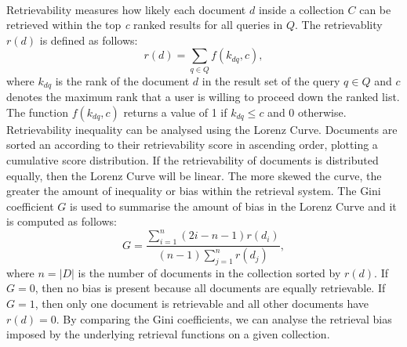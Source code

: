 \ \\
Retrievability measures how likely each document $ d $ inside a collection $ C $ can be retrieved within the top \textit{c} ranked results for all queries in $ Q $. The retrievablity $ r(d) $ is defined as follows:
\[
r(d)=\sum_{q \in Q}f(k_{dq},c),
\]
where $ k_{dq} $ is the rank of the document $ d $ in the result set of the query $ q \in Q $ and $ c $ denotes the maximum rank that a user is willing to proceed down the ranked list. The function $ f(k_{dq},c) $ returns a value of 1 if $ k_{dq} \leq c $ and 0 otherwise. Retrievability inequality can be analysed using the Lorenz Curve. Documents are sorted an according to their retrievability score in ascending order, plotting a cumulative score distribution. If the retrievability of documents is distributed equally, then the Lorenz Curve will be linear. The more skewed the curve, the greater the amount of inequality or bias within the retrieval system. The Gini coefficient $ G $ is used to summarise the amount of bias in the Lorenz Curve and it is computed as follows:
\begin{equation}
G=\frac{\sum_{i=1}^n(2i-n-1)r(d_{i})}{(n-1)\sum_{j=1}^nr(d_{j})},
\end{equation}
\noindent
where $ n=|D| $ is the number of documents in the collection sorted by $ r(d) $. If $ G=0 $, then no bias is present because all documents are equally retrievable. If $ G=1 $, then only one document is retrievable and all other documents have $ r(d)=0 $. By comparing the Gini coefficients, we can analyse the retrieval bias imposed by the underlying retrieval functions on a given collection.
